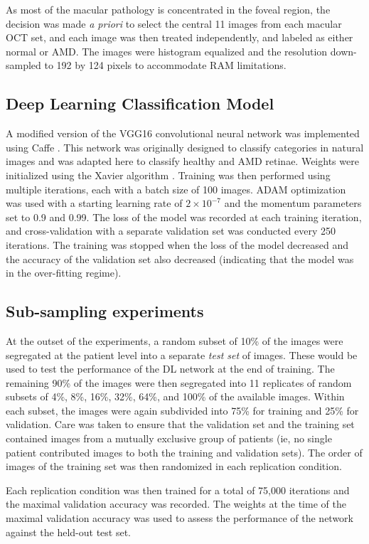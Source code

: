 As most of the macular pathology is concentrated in the foveal region, the
decision was made \emph{a priori} to select the central 11 images from each
macular OCT set, and each image was then treated independently, and labeled as
either normal or AMD. The images were histogram equalized and the resolution
down-sampled to 192 by 124 pixels to accommodate RAM limitations.

\subsection{Deep Learning Classification Model}

A modified version of the VGG16 convolutional neural network
\citep{Simonyan2014-al} was implemented using Caffe \citep{jia2014caffe}. This
network was originally designed to classify categories in natural images and was
adapted here to classify healthy and AMD retinae. Weights were initialized using
the Xavier algorithm \citep{Glorot2010-is}. Training was then performed using
multiple iterations, each with a batch size of 100 images. ADAM optimization
\citep{Kingma2014-jl} was used with a starting learning rate of $2 \times
10^{-7}$ and the momentum parameters set to 0.9 and 0.99. The loss of the model
was recorded at each training iteration, and cross-validation with a separate
validation set was conducted every 250 iterations. The training was stopped when
the loss of the model decreased and the accuracy of the validation set
also decreased (indicating that the model was in the over-fitting regime).

\subsection{Sub-sampling experiments}

At the outset of the experiments, a random subset of 10\% of the images were
segregated at the patient level into a separate \emph{test set} of images. These
would be used to test the performance of the DL network at the end of training.
The remaining 90\% of the images were then segregated into 11 replicates of
random subsets of 4\%, 8\%, 16\%, 32\%, 64\%, and 100\% of the available images.
Within each subset, the images were again subdivided into 75\% for training and
25\% for validation. Care was taken to ensure that the validation set and the
training set contained images from a mutually exclusive group of patients (ie,
no single patient contributed images to both the training and validation sets).
The order of images of the training set was then randomized in each replication
condition.

Each replication condition was then trained for a total of 75,000 iterations
and the maximal validation accuracy was recorded. The weights at the time of
the maximal validation accuracy was used to assess the performance of the
network against the held-out test set.
